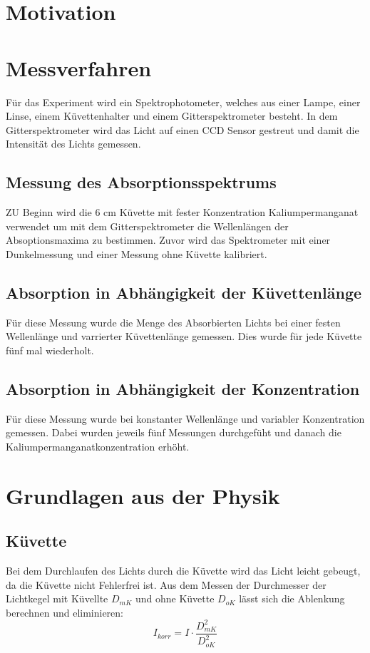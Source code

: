 \section{Motivation}



\section{Messverfahren}
Für das Experiment wird ein Spektrophotometer, welches aus einer Lampe, einer Linse, einem Küvettenhalter und einem
Gitterspektrometer besteht. In dem Gitterspektrometer wird das Licht auf einen CCD Sensor gestreut und damit die
Intensität des Lichts gemessen.

\subsection{Messung des Absorptionsspektrums}
ZU Beginn wird die 6 cm Küvette mit fester Konzentration Kaliumpermanganat verwendet um mit dem Gitterspektrometer
die Wellenlängen der Absoptionsmaxima zu bestimmen. Zuvor wird das Spektrometer mit einer Dunkelmessung und 
einer Messung ohne Küvette kalibriert.

\subsection{Absorption in Abhängigkeit der Küvettenlänge}
Für diese Messung wurde die Menge des Absorbierten Lichts bei einer festen Wellenlänge und varrierter
Küvettenlänge gemessen. Dies wurde für jede Küvette fünf mal wiederholt.

\subsection{Absorption in Abhängigkeit der Konzentration}

Für diese Messung wurde bei konstanter Wellenlänge und variabler Konzentration gemessen. Dabei wurden jeweils fünf Messungen
durchgefüht und danach die Kaliumpermanganatkonzentration erhöht.



\section{Grundlagen aus der Physik}

\subsection{Küvette}
Bei dem Durchlaufen des Lichts durch die Küvette wird das Licht leicht gebeugt, da die Küvette nicht Fehlerfrei ist.
Aus dem Messen der Durchmesser der Lichtkegel mit Küvellte $D_{mK}$ und ohne Küvette $D_{oK}$ lässt sich die Ablenkung berechnen und eliminieren:
\begin{equation}
    I_{korr} = I \cdot \frac{D_{mK}^2}{D_{oK}^2}
    \label{eq:Ikorr}
\end{equation}

